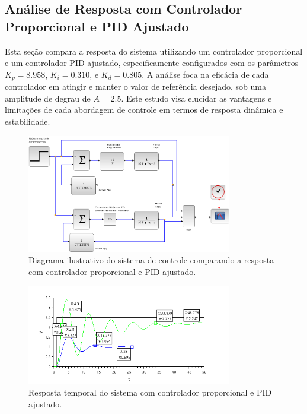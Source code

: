 \subsection{Análise de Resposta com Controlador Proporcional e PID Ajustado}

Esta seção compara a resposta do sistema utilizando um controlador proporcional e um controlador PID ajustado, especificamente configurados com os parâmetros \( K_p = 8.958 \), \( K_i = 0.310 \), e \( K_d = 0.805 \). A análise foca na eficácia de cada controlador em atingir e manter o valor de referência desejado, sob uma amplitude de degrau de \( A = 2.5 \). Este estudo visa elucidar as vantagens e limitações de cada abordagem de controle em termos de resposta dinâmica e estabilidade.

\begin{figure}[H]
    \centering
    \includegraphics[width=0.8\textwidth]{6-atividade/assets/b/diagrama-comparacao-proporcional-pid.png}
    \caption{Diagrama ilustrativo do sistema de controle comparando a resposta com controlador proporcional e PID ajustado.}
    \label{fig:diagrama-comparacao-proporcional-pid}
\end{figure}

\begin{figure}[H]
    \centering
    \includegraphics[width=0.8\textwidth]{6-atividade/assets/b/comparacao-proporcional-pid.png}
    \caption{Resposta temporal do sistema com controlador proporcional e PID ajustado.}
    \label{fig:comparacao-proporcional-pid}
\end{figure}

